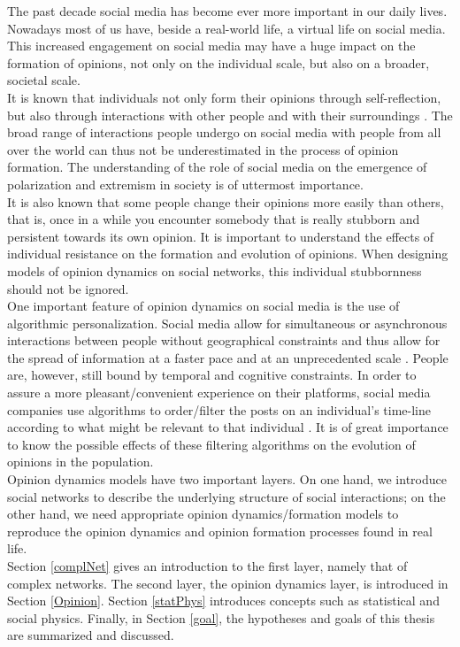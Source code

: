\documentclass[11 pt , letterpaper , twoside , openright]{book}
\begin{document}
The past decade social media has become ever more important in our daily lives. Nowadays most of us have, beside a real-world life, a virtual life on social media. This increased engagement on social media may have a huge impact on the formation of opinions, not only on the individual scale, but also on a broader, societal scale. \\
\newline
It is known that individuals not only form their opinions through self-reflection, but also through interactions with other people and with their surroundings \cite{Perra2019}. The broad range of interactions people undergo on social media with people from all over the world can thus not be underestimated in the process of opinion formation. The understanding of the role of social media on the emergence of polarization and extremism in society is of uttermost importance.\\
\newline
It is also known that some people change their opinions more easily than others, that is, once in a while you encounter somebody that is really stubborn and persistent towards its own opinion. It is important to understand the effects of individual resistance on the formation and evolution of opinions. When designing models of opinion dynamics on social networks, this individual stubbornness should not be ignored.\\
\newline
One important feature of opinion dynamics on social media is the use of algorithmic personalization. Social media allow for simultaneous or asynchronous interactions between people without geographical constraints and thus allow for the spread of information at a faster pace and at an unprecedented scale \cite{Perra2019}. People are, however, still bound by temporal and cognitive constraints. In order to assure a more pleasant/convenient experience on their platforms, social media companies use algorithms to order/filter the posts on an individual's time-line according to what might be relevant to that individual \cite{Perra2019}. It is of great importance to know the possible effects of these filtering algorithms on the evolution of opinions in the population.\\  
\newline
Opinion dynamics models have two important layers. On one hand, we introduce social networks to describe the underlying structure of social interactions; on the other hand, we need appropriate opinion dynamics/formation models to reproduce the opinion dynamics and opinion formation processes found in real life.\\
\newline
Section \ref{complNet} gives an introduction to the first layer, namely that of complex networks. The second layer, the opinion dynamics layer, is introduced in Section \ref{Opinion}. Section \ref{statPhys} introduces concepts such as statistical and social physics. Finally, in Section \ref{goal}, the hypotheses and goals of this thesis are summarized and discussed.
\end{document}
